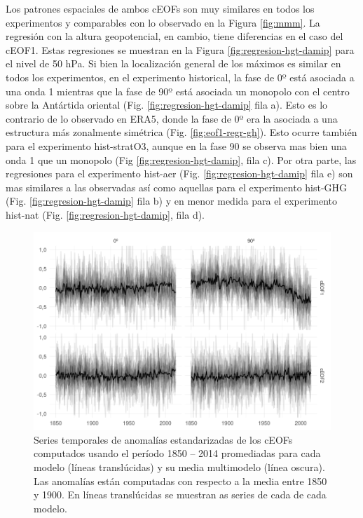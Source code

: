 \documentclass[12pt,oneside,a4paper]{reedthesis}
\begin{document}
Los patrones espaciales de ambos cEOFs son muy similares en todos los experimentos y comparables con lo observado en la Figura \ref{fig:mmm}.
La regresión con la altura geopotencial, en cambio, tiene diferencias en el caso del cEOF1.
Estas regresiones se muestran en la Figura \ref{fig:regresion-hgt-damip} para el nivel de 50 hPa.
Si bien la localización general de los máximos es similar en todos los experimentos, en el experimento historical, la fase de 0º está asociada a una onda 1 mientras que la fase de 90º está asociada un monopolo con el centro sobre la Antártida oriental (Fig. \ref{fig:regresion-hgt-damip} fila a).
Esto es lo contrario de lo observado en ERA5, donde la fase de 0º era la asociada a una estructura más zonalmente simétrica (Fig. \ref{fig:eof1-regr-gh}).
Esto ocurre también para el experimento hist-stratO3, aunque en la fase 90 se observa mas bien una onda 1 que un monopolo (Fig \ref{fig:regresion-hgt-damip}, fila c).
Por otra parte, las regresiones para el experimento hist-aer (Fig. \ref{fig:regresion-hgt-damip} fila e) son mas similares a las observadas así como aquellas para el experimento hist-GHG (Fig. \ref{fig:regresion-hgt-damip} fila b) y en menor medida para el experimento hist-nat (Fig. \ref{fig:regresion-hgt-damip}, fila d).

\begin{figure}

{\centering \includegraphics{figures/50-cmip6/series-largas-1} 

}

\caption{Series temporales de anomalías estandarizadas de los cEOFs computados usando el período 1850 -- 2014 promediadas para cada modelo (líneas translúcidas) y su media multimodelo (línea oscura). Las anomalías están computadas con respecto a la media entre 1850 y 1900. En líneas translúcidas se muestran as series de cada de cada modelo.}\label{fig:series-largas}
\end{figure}
\end{document}
